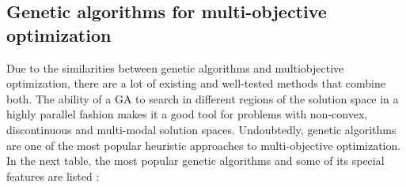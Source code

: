 \newpage

\subsection{Genetic algorithms for multi-objective optimization}
        
    Due to the similarities between genetic algorithms and multiobjective optimization, there are a lot of existing and well-tested methods that combine both. The ability of a GA to search in different regions of the solution space in a highly parallel fashion makes it a good tool for problems with non-convex, discontinuous and multi-modal solution spaces. Undoubtedly, genetic algorithms are one of the most popular heuristic approaches to multi-objective optimization. 
    In the next table, the most popular genetic algorithms and some of its special features are listed \cite{konak2006multi}:
